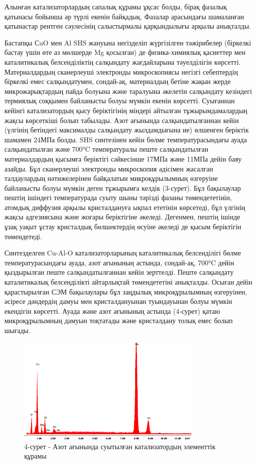 \begin{multicols}{2}
Алынған катализаторлардың сапалық құрамы ұқсас болды, бірақ фазалық
қатынасы бойынша әр түрлі екенін байқадық. Фазалар арасындағы шамаланған
қатынастар рентген сәулесінің салыстырмалы қарқындылығы арқылы
анықталды.

Бастапқы СuO мен Al SHS жануына негізделіп жүргізілген тәжірибелер
(біркелкі бастау үшін өте аз мөлшерде Mg қосылған) де физика-химиялық
қасиеттер мен каталитикалық белсенділіктің салқындату жағдайларына
тәуелділігін көрсетті. Материалдардың сканерлеуші электронды
микроскопиясы негізгі себептердің біркелкі емес салқындатумен,
сондай-ақ, материалдың бетіне жақын жерде микрожарықтардың пайда болуына
және таралуына әкелетін салқындату кезіндегі термиялық соққымен
байланысты болуы мүмкін екенін көрсетті. Суығаннан кейінгі
катализатордың қысу беріктігінің міндері айтылған тұжырымдамалардың
жақсы көрсеткіші болып табылады. Азот ағынында салқындатылғаннан кейін
(үлгінің бетіндегі максималды салқындату жылдамдығына ие) өлшенген
беріктік шамамен 24МПа болды. SHS синтезінен кейін бөлме
температурасындағы ауада салқындатылған және 700°C температуралы пеште
салқындатылған материалдардың қысымға беріктігі сәйкесінше 17МПа және
11МПа дейін баяу азайды. Бұл сканерлеуші электронды микроскопия әдісімен
жасалған талдаулардың нәтижелерінен байқалатын микроқұрылымның өзгеруіне
байланысты болуы мүмкін деген тұжырымға келдік (3-сурет). Бұл бақылаулар
пештің ішіндегі температурада суыту шыны тәрізді фазаны төмендететінін,
атомдық диффузия арқылы кристалдануға ықпал ететінін көрсетеді, бұл
үлгінің жақсы адгезиясына және жоғары беріктігіне әкеледі. Дегенмен,
пештің ішінде ұзақ уақыт ұстау кристалдық бөлшектердің өсуіне әкеледі де
қысым беріктігін төмендетеді.

Синтезделген Cu-Al-O катализаторларының каталитикалық белсенділігі бөлме
температурасындағы ауада, азот ағынының астында, сондай-ақ, 700°C дейін
қыздырылған пеште салқындатылғаннан кейін зерттелді. Пеште салқындату
каталитикалық белсенділікті айтарлықтай төмендететіні анықталды. Осыған
дейін қарастырылған СЭМ бақылаулары бұл заңдылық микроқұрылымның
өзгеруінен, әсіресе дәндердің дамуы мен кристалдануынан туындауынан
болуы мүмкін екендігін көрсетті. Ауада және азот ағынының астында
(4-сурет) қатаю микроқұрылымның дамуын тоқтатады және кристалдану толық
емес болып шығады.
\end{multicols}

\begin{figure}[H]
	\centering
	\includegraphics[width=0.8\textwidth]{assets/74}
	\caption*{4-сурет - Азот ағынында суытылған катализатордың элементтік құрамы}
\end{figure}


